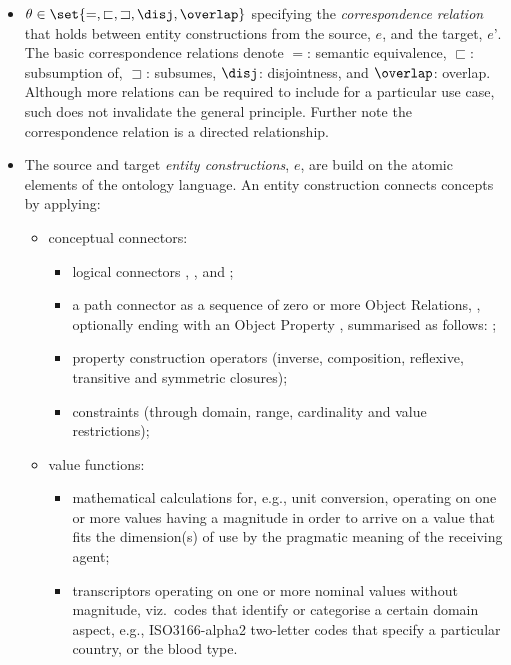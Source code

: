 \documentclass[sort&compress,preprint,authoryear,3p,twocolumn]{elsarticle}
\providecommand{\tightlist}{%
  \setlength{\itemsep}{0pt}\setlength{\parskip}{0pt}}
\begin{document}
\begin{itemize}
\tightlist
\item
  \(\theta \in \set{=, \sqsubset, \sqsupset, \disj, \overlap }\)
  specifying the \emph{correspondence relation} that holds between
  entity constructions from the source, \(e\), and the target, \(e’\).
  The basic correspondence relations denote \(=\): semantic equivalence,
  \(\sqsubset\): subsumption of, \(\sqsupset\): subsumes, \(\disj\):
  disjointness, and \(\overlap\): overlap. Although more relations can
  be required to include for a particular use case, such does not
  invalidate the general principle. Further note the correspondence
  relation is a directed relationship.
\item
  The source and target \emph{entity constructions}, \(e\), are build on
  the atomic elements of the ontology language. An entity construction
  connects concepts by applying:

  \begin{itemize}
  \tightlist
  \item
    conceptual connectors:

    \begin{itemize}
    \tightlist
    \item
      logical connectors , , and ;
    \item
      a path connector as a sequence of zero or more Object Relations,
      , optionally ending with an Object Property ,
      summarised as follows: ;
    \item
      property construction operators (inverse, composition, reflexive,
      transitive and symmetric closures);
    \item
      constraints (through domain, range, cardinality and value
      restrictions);
    \end{itemize}
  \item
    value functions:

    \begin{itemize}
    \tightlist
    \item
      mathematical calculations for, e.g., unit conversion, operating on
      one or more values having a magnitude in order to arrive on a
      value that fits the dimension(s) of use by the pragmatic meaning
      of the receiving agent;
    \item
      transcriptors operating on one or more nominal values without
      magnitude, viz.~codes that identify or categorise a certain domain
      aspect, e.g., ISO3166-alpha2 two-letter codes that specify a
      particular country, or the blood type.
    \end{itemize}
  \end{itemize}
\end{itemize}
\end{document}
